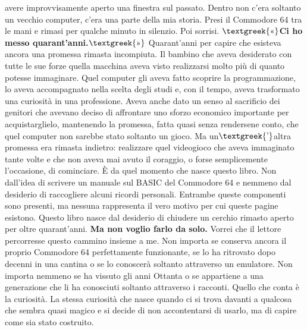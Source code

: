 \documentclass{article}
\begin{document}
avere improvvisamente aperto una finestra sul passato.\newline
Dentro non c'era soltanto un vecchio computer, c'era una parte della mia storia. Presi il Commodore 64 tra le mani e
rimasi per qualche minuto in silenzio. Poi sorrisi.\newline
\textbf{$\text{\textgreek{«}}$Ci ho messo quarant'anni.$\text{\textgreek{»}}$}\newline
Quarant'anni per capire che esisteva ancora una promessa rimasta incompiuta.\newline
Il bambino che aveva desiderato con tutte le sue forze quella macchina aveva visto realizzarsi molto più di quanto
potesse immaginare. Quel computer gli aveva fatto scoprire la programmazione, lo aveva accompagnato nella scelta degli
studi e, con il tempo, aveva trasformato una curiosità in una professione. Aveva anche dato un senso al sacrificio dei
genitori che avevano deciso di affrontare uno sforzo economico importante per acquistarglielo, mantenendo la promessa,
fatta quasi senza rendersene conto, che quel computer non sarebbe stato soltanto un gioco.\newline
Ma un$\text{\textgreek{’}}$altra promessa era rimasta indietro: realizzare quel videogioco che aveva immaginato tante
volte e che non aveva mai avuto il coraggio, o forse semplicemente l'occasione, di cominciare.\newline
È da quel momento che nasce questo libro. Non dall'idea di scrivere un manuale sul BASIC del Commodore 64 e nemmeno dal
desiderio di raccogliere alcuni ricordi personali. Entrambe queste componenti sono presenti, ma nessuna rappresenta il
vero motivo per cui queste pagine esistono. Questo libro nasce dal desiderio di chiudere un cerchio rimasto aperto per
oltre quarant'anni.\newline
\textbf{Ma non voglio farlo da solo.}\newline
Vorrei che il lettore percorresse questo cammino insieme a me. Non importa se conserva ancora il proprio Commodore 64
perfettamente funzionante, se lo ha ritrovato dopo decenni in una cantina o se lo conoscerà soltanto attraverso un
emulatore. Non importa nemmeno se ha vissuto gli anni Ottanta o se appartiene a una generazione che li ha conosciuti
soltanto attraverso i racconti.\newline
Quello che conta è la curiosità. La stessa curiosità che nasce quando ci si trova davanti a qualcosa che sembra quasi
magico e si decide di non accontentarsi di usarlo, ma di capire come sia stato costruito.\newline
\end{document}
